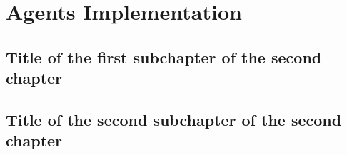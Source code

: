\chapter{Agents Implementation}

\section{Title of the first subchapter of the second chapter}

\section{Title of the second subchapter of the second chapter}
